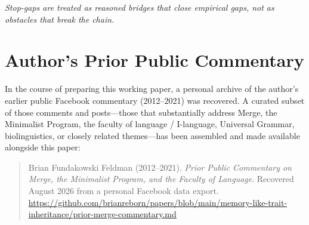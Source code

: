\documentclass[11pt,a4paper]{article}
\begin{document}
\begin{center}
\end{center}

\vspace{0.6em}
\noindent\textit{\small Stop-gaps are treated as reasoned bridges that close empirical gaps, not as obstacles that break the chain.}


\section{Author's Prior Public Commentary}
In the course of preparing this working paper, a personal archive of the author's earlier public Facebook commentary (2012--2021) was recovered. A curated subset of those comments and posts---those that substantially address Merge, the Minimalist Program, the faculty of language / I-language, Universal Grammar, biolinguistics, or closely related themes---has been assembled and made available alongside this paper:

\begin{quote}
\small
Brian Fundakowski Feldman (2012--2021). \textit{Prior Public Commentary on Merge, the Minimalist Program, and the Faculty of Language}. Recovered August 2026 from a personal Facebook data export.\\\url{https://github.com/brianreborn/papers/blob/main/memory-like-trait-inheritance/prior-merge-commentary.md}
\end{quote}
\end{document}
